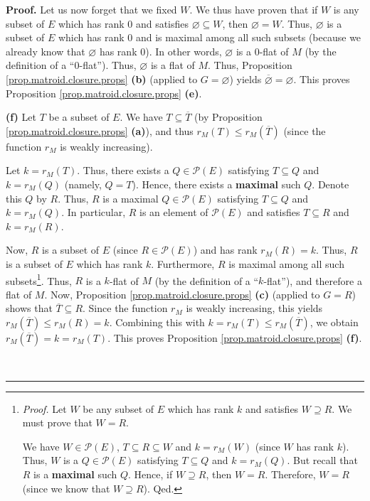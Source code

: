 \documentclass[numbers=enddot,12pt,final,onecolumn,notitlepage]{scrartcl}%
\theoremstyle{definition}
\newenvironment{proof}[1][Proof]{\noindent\textbf{#1.} }{\ \rule{0.5em}{0.5em}}
\begin{document}
\begin{proof}
Let us now forget that we fixed $W$. We thus have proven that if $W$ is any
subset of $E$ which has rank $0$ and satisfies $\varnothing\subseteq W$, then
$\varnothing=W$. Thus, $\varnothing$ is a subset of $E$ which has rank $0$ and
is maximal among all such subsets (because we already know that $\varnothing$
has rank $0$). In other words, $\varnothing$ is a $0$-flat of $M$ (by the
definition of a \textquotedblleft$0$-flat\textquotedblright). Thus,
$\varnothing$ is a flat of $M$. Thus, Proposition
\ref{prop.matroid.closure.props} \textbf{(b)} (applied to $G=\varnothing$)
yields $\overline{\varnothing}=\varnothing$. This proves Proposition
\ref{prop.matroid.closure.props} \textbf{(e)}.

\textbf{(f)} Let $T$ be a subset of $E$. We have $T\subseteq\overline{T}$ (by
Proposition \ref{prop.matroid.closure.props} \textbf{(a)}), and thus
$r_{M}\left(  T\right)  \leq r_{M}\left(  \overline{T}\right)  $ (since the
function $r_{M}$ is weakly increasing).

Let $k=r_{M}\left(  T\right)  $. Thus, there exists a $Q\in\mathcal{P}\left(
E\right)  $ satisfying $T\subseteq Q$ and $k=r_{M}\left(  Q\right)  $ (namely,
$Q=T$). Hence, there exists a \textbf{maximal} such $Q$. Denote this $Q$ by
$R$. Thus, $R$ is a maximal $Q\in\mathcal{P}\left(  E\right)  $ satisfying
$T\subseteq Q$ and $k=r_{M}\left(  Q\right)  $. In particular, $R$ is an
element of $\mathcal{P}\left(  E\right)  $ and satisfies $T\subseteq R$ and
$k=r_{M}\left(  R\right)  $.

Now, $R$ is a subset of $E$ (since $R\in\mathcal{P}\left(  E\right)  $) and
has rank $r_{M}\left(  R\right)  =k$. Thus, $R$ is a subset of $E$ which has
rank $k$. Furthermore, $R$ is maximal among all such
subsets\footnote{\textit{Proof.} Let $W$ be any subset of $E$ which has rank
$k$ and satisfies $W\supseteq R$. We must prove that $W=R$.
\par
We have $W\in\mathcal{P}\left(  E\right)  $, $T\subseteq R\subseteq W$ and
$k=r_{M}\left(  W\right)  $ (since $W$ has rank $k$). Thus, $W$ is a
$Q\in\mathcal{P}\left(  E\right)  $ satisfying $T\subseteq Q$ and
$k=r_{M}\left(  Q\right)  $. But recall that $R$ is a \textbf{maximal} such
$Q$. Hence, if $W\supseteq R$, then $W=R$. Therefore, $W=R$ (since we know
that $W\supseteq R$). Qed.}. Thus, $R$ is a $k$-flat of $M$ (by the definition
of a \textquotedblleft$k$-flat\textquotedblright), and therefore a flat of
$M$. Now, Proposition \ref{prop.matroid.closure.props} \textbf{(c)} (applied
to $G=R$) shows that $\overline{T}\subseteq R$. Since the function $r_{M}$ is
weakly increasing, this yields $r_{M}\left(  \overline{T}\right)  \leq
r_{M}\left(  R\right)  =k$. Combining this with $k=r_{M}\left(  T\right)  \leq
r_{M}\left(  \overline{T}\right)  $, we obtain $r_{M}\left(  \overline
{T}\right)  =k=r_{M}\left(  T\right)  $. This proves Proposition
\ref{prop.matroid.closure.props} \textbf{(f)}.


\end{proof}
\end{document}
